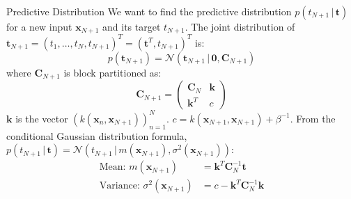 \documentclass{beamer} %
\newcommand{\mat}[1]{\mathbf{#1}}
\newcommand{\vect}[1]{\mathbf{#1}}
\newcommand{\given}{\,|\,}
\begin{document}
\begin{frame}{Predictive Distribution}
  We want to find the predictive distribution $p(t_{N+1} \given \vect{t})$ for a new input $\vect{x}_{N+1}$ and its target $t_{N+1}$.
  The joint distribution of $\vect{t}_{N+1} = (t_1, \dots, t_N, t_{N+1})^T = (\vect{t}^T, t_{N+1})^T$ is:
  \begin{equation*}
    p(\vect{t}_{N+1}) = \mathcal{N}(\vect{t}_{N+1} \given \mathbf{0}, \mat{C}_{N+1})
  \end{equation*}
  where $\mat{C}_{N+1}$ is block partitioned as:
  \begin{equation*}
    \mat{C}_{N+1} = \begin{pmatrix} \mat{C}_N & \vect{k} \\ \vect{k}^T & c \end{pmatrix}
  \end{equation*}
  $\vect{k}$ is the vector $(k(\vect{x}_n, \vect{x}_{N+1}))_{n=1}^N$.
  $c = k(\vect{x}_{N+1}, \vect{x}_{N+1}) + \beta^{-1}$.
  \vspace{0.5em}
  From the conditional Gaussian distribution formula, $p(t_{N+1} \given \vect{t}) = \mathcal{N}(t_{N+1} \given m(\vect{x}_{N+1}), \sigma^2(\vect{x}_{N+1}))$:
  \begin{align*}
    \text{Mean: } m(\vect{x}_{N+1}) &= \vect{k}^T \mat{C}_N^{-1} \vect{t} \\
    \text{Variance: } \sigma^2(\vect{x}_{N+1}) &= c - \vect{k}^T \mat{C}_N^{-1} \vect{k}
  \end{align*}
\end{frame}
\end{document}
